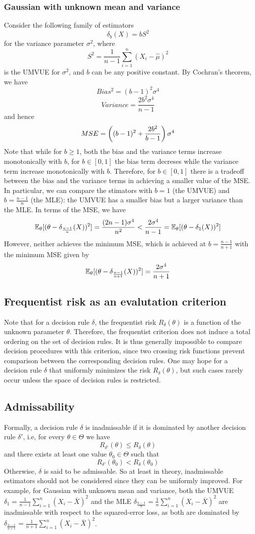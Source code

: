 \documentclass[11pt]{book}
\begin{document}
\subsubsection{Gaussian with unknown mean and variance}
Consider the following family of estimators 
\[
  \delta_b(X) = bS^2 
\] 
for the variance parameter $\sigma^2$, where 
\[
  S^2 = \frac{1}{n-1}\sum_{i=1}^n (X_i - \hat{\mu})^2 
\] 
is the UMVUE for $\sigma^2$, and $b$ can be any positive constant. By Cochran's theorem, we have 
\[
  Bias^2 = (b-1)^2 \sigma^4
\]
\[
  Variance = \frac{2b^2\sigma^4}{n-1}
\]
and hence 
\[
  MSE = \left( (b-1)^2 + \frac{2b^2}{b-1} \right) \sigma^4
\]
Note that while for $b\geq 1$, both the bias and the variance terms increase monotonically with $b$,
for $b\in[0,1]$ the bias term decreses while the variance term increase monotonically with $b$. Therefore, for $b\in[0,1]$ 
there is a tradeoff between the bias and the variance terms in achieving a smaller value of the MSE. In particular, 
we can compare the stimators with $b=1$ (the UMVUE) and $b = \frac{n-1}{n}$ (the MLE): the UMVUE has a smaller bias but a larger 
variance than the MLE. In terms of the MSE, we have 
\[
  \mathbb{E}_\theta[(\theta - \delta_{\frac{n-1}{n}}(X))^2] = \frac{(2n-1)\sigma^4}{n^2} < \frac{2\sigma^4}{n-1} = \mathbb{E}_\theta[(\theta - \delta_1(X))^2]
\]
However, neither achieves the minimum MSE, which is achieved at $b = \frac{n-1}{n+1}$ with the minimum MSE given by 
\[
  \mathbb{E}_\theta[(\theta - \delta_{\frac{n-1}{n+1}}(X))^2] = \frac{2\sigma^4}{n+1}
\]
\subsection{Frequentist risk as an evalutation criterion}
Note that for a decision rule $\delta$, the frequentist risk $R_\delta(\theta)$ is a function of the unknown parameter $\theta$. Therefore, the frequentist criterion 
does not induce a total ordering on the set of decision rules. It is thus generally impossible to compare decision procedures with this criterion, since two crossing risk functions prevent comparison between the corresponding decision rules.
One may hope for a decision rule $\delta$ that uniformly minimizes the risk $R_\delta(\theta)$, but such cases rarely occur unless the space of decision rules is restricted.

\subsection{Admissability}
Formally, a decision rule $\delta$ is inadmissable if it is dominated by another decision rule $\delta'$, i.e, for every $\theta \in \Theta$ we have 
\[
  R_{\delta'}(\theta) \leq R_\delta(\theta) 
\] 
and there exists at least one value $\theta_0 \in \Theta$ such that 
\[
  R_{\delta'}(\theta_0) < R_\delta(\theta_0)
\]
Otherwise, $\delta$ is said to be admissable. So at least in theory, inadmissable estimators should not be 
considered since they can be uniformly improved. For example, for Gaussian with unknown mean and variance, both the 
UMVUE $\delta_1 = \frac{1}{n-1} \sum_{i=1}^n (X_i - \bar{X})^2$ and the MLE $\delta_{\frac{n-1}{n}} = \frac{1}{n} \sum_{i=1}^n(X_i - \bar{X})^2$ are inadmissable with 
respect to the squared-error loss, as both are dominated by $\delta_{\frac{n-1}{n+1}} = \frac{1}{n+1} \sum_{i=1}^n (X_i - \bar{X})^2$.
\end{document}
